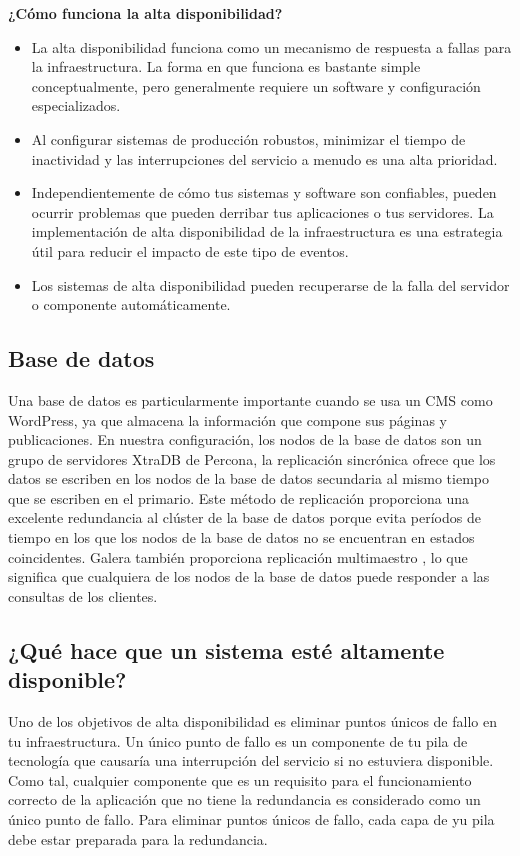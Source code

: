 \documentclass{article}
\begin{document}
\begin{multicols}{2}
\textbf{¿Cómo funciona la alta disponibilidad?}

\begin{itemize}
\item La alta disponibilidad funciona como un mecanismo de respuesta a fallas para la infraestructura. La forma en que funciona es bastante simple conceptualmente, pero generalmente requiere un software y configuración especializados.
\item Al configurar sistemas de producción robustos, minimizar el tiempo de inactividad y las interrupciones del servicio a menudo es una alta prioridad.
\item Independientemente de cómo tus sistemas y software son confiables, pueden ocurrir problemas que pueden derribar tus aplicaciones o tus servidores. La implementación de alta disponibilidad de la infraestructura es una estrategia útil para reducir el impacto de este tipo de eventos.
\item Los sistemas de alta disponibilidad pueden recuperarse de la falla del servidor o componente automáticamente.
\end{itemize}

\subsection{Base de datos}

Una base de datos es particularmente importante cuando se usa un CMS como WordPress, ya que almacena la información que compone sus páginas y publicaciones.
En nuestra configuración, los nodos de la base de datos son un grupo de servidores XtraDB de Percona, la replicación sincrónica ofrece que los datos se escriben en los nodos de la base de datos secundaria al mismo tiempo que se escriben en el primario. Este método de replicación proporciona una excelente redundancia al clúster de la base de datos porque evita períodos de tiempo en los que los nodos de la base de datos no se encuentran en estados coincidentes. Galera también proporciona replicación multimaestro , lo que significa que cualquiera de los nodos de la base de datos puede responder a las consultas de los clientes.


\subsection{¿Qué hace que un sistema esté altamente disponible?}
Uno de los objetivos de alta disponibilidad es eliminar puntos únicos de fallo en tu infraestructura. Un único punto de fallo es un componente de tu pila de tecnología que causaría una interrupción del servicio si no estuviera disponible.
Como tal, cualquier componente que es un requisito para el funcionamiento correcto de la aplicación que no tiene la redundancia es considerado como un único punto de fallo.
Para eliminar puntos únicos de fallo, cada capa de yu pila debe estar preparada para la redundancia.


\end{multicols}
\end{document}
